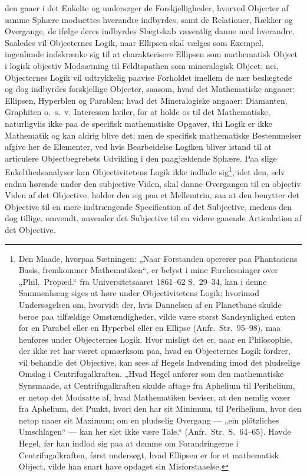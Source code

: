 \documentclass[12pt]{book}
\newcommand{\opage}[1]{\marginnote{\footnotesize\textit{[#1]}}}
\begin{document}
\opage{267} den gaaer i det Enkelte og undersøger de Forskjelligheder, hvorved Objecter af samme Sphære modsættes
hverandre indbyrdes, samt de Relationer, Rækker og Overgange, de ifølge deres indbyrdes Slægtskab
væsentlig danne med hverandre. Saaledes vil Objecternes Logik, naar Ellipsen skal vælges som Exempel,
ingenlunde indskrænke sig til at charakterisere Ellipsen som mathematisk Object i logisk objectiv
Modsætning til Feldtspathen som mineralogisk Object; nei, Objecternes Logik vil udtrykkelig paavise
Forholdet imellem de nær beslægtede og dog indbyrdes forskjellige Objecter, saasom, hvad det
Mathematiske angaaer: Ellipsen, Hyperblen og Parablen; hvad det Mineralogiske angaaer: Diamanten,
Graphiten o.\ s.\ v. Interessen hviler, for at holde os til det Mathematiske, naturligviis ikke paa de
specifisk mathematiske Opgaver, thi Logik er ikke Mathematik og kan aldrig blive det; men de specifisk
mathematiske Bestemmelser afgive her de Elementer, ved hvis Bearbeidelse Logiken bliver istand til at
articulere Objectbegrebets Udvikling i den paagjældende Sphære. Paa slige Enkelthedsanalyser kan
Objectivitetens Logik ikke indlade sig\footnote{Den Maade, hvorpaa Sætningen: „Naar Forstanden
opererer paa Phantasiens Basis, fremkommer Mathematiken“, er belyst i mine Forelæsninger over
„Phil.\ Propæd.“ fra Universitetsaaret 1861--62 S.~29--34, kan i denne Sammenhæng siges at høre under
Objectivitetens Logik; hvorimod Undersøgelsen om, hvorvidt der, hvis Dannelsen af en Planetbane skulde
beroe paa tilfældige Omstændigheder, vilde være størst Sandsynlighed enten for en Parabel eller en
Hyperbel eller en Ellipse (Anfr.\ Str.~95--98), maa henføres under Objecternes Logik. Hvor misligt det
er, naar en Philosophie, der ikke ret har været opmærksom paa, hvad en Objecternes Logik fordrer, vil
behandle det Objective, kan sees af Hegels Indvending imod det pludselige Omslag i Centrifugalkraften.
„Hvad Hegel anfører som den mathematiske Synsmaade, at Centrifugalkraften skulde aftage fra Aphelium
til Perihelium, er netop det Modsatte af, hvad Mathematiken beviser, at den nemlig voxer fra Aphelium,
det Punkt, hvori den har sit Minimum, til Perihelium, hvor den netop naaer sit Maximum; om en pludselig
Overgang --- „ein plötzliches Umschlagen“ --- kan her slet ikke være Tale.“ (Anfr.\ Str.\ S.~64--65).
Havde Hegel, før han indlod sig paa at dømme om Forandringerne i Centrifugalkraften, først undersøgt,
hvad Ellipsen er for et mathematisk Object, vilde han snart have opdaget sin Misforstaaelse.}; idet
den, selv
\opage{268} endnu hørende under den subjective Viden, skal danne Overgangen til en objectiv Viden af det Objective,
holder den sig paa et Mellemtrin, saa at den benytter det Objective til en mere indtrængende
Specification af det Subjective, medens den dog tillige, omvendt, anvender det Subjective til en videre
gaaende Articulation af det Objective.
\end{document}
